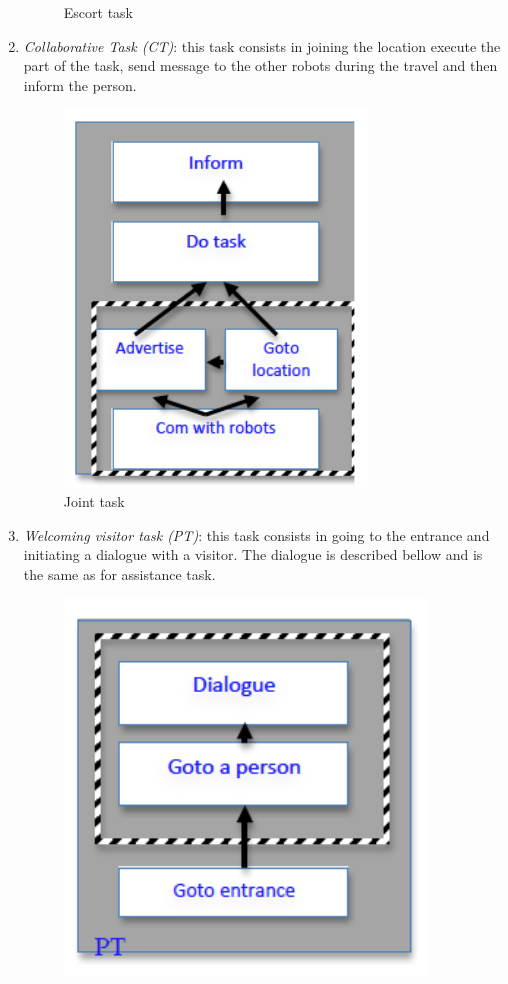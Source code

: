 \documentclass{article}
\begin{document}
\begin{enumerate}
\begin{figure}[htbp]
\begin{center}
\caption{Escort task }
\label{FigEscortTask}
\end{center}
\end{figure}

\item {\it Collaborative Task (CT)}: this task consists in joining the location execute the part of the task, send message to the other robots during the travel and then inform the person.
\begin{figure}[htbp]
\begin{center}
\includegraphics[height=10cm]{JointTask}
\caption{Joint task }
\label{FigjointTask}
\end{center}
\end{figure}
\item {\it Welcoming visitor task  (PT)}: this task consists in going to the entrance and initiating a dialogue with a visitor. The dialogue is described bellow  and is the same as for assistance task. 
\begin{figure}[htbp]
\begin{center}
\includegraphics[height=10cm]{patrolTask}

\end{center}
\end{figure}
\end{enumerate}
\end{document}

